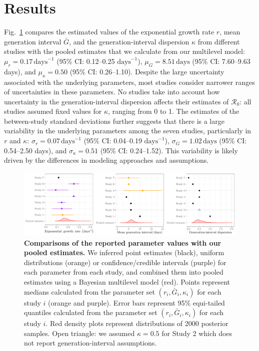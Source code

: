 \documentclass[12pt]{article}
\newcommand{\fref}[1]{Fig.~\ref{fig:#1}}
\newcommand{\Ro}{\ensuremath{{\mathcal R}_{0}}\xspace}
\begin{document}
\section{Results}

\fref{assumption} compares the estimated values of the exponential growth rate $r$, mean generation interval $\bar G$, and the generation-interval dispersion $\kappa$ from different studies with the pooled estimates that we calculate from our multilevel model:
$\mu_r = 0.17\,\textrm{days}^{-1}$ (95\% CI: 0.12--0.25 $\textrm{days}^{-1}$),
$\mu_G = 8.51\,\textrm{days}$ (95\% CI: 7.60--9.63 days),
and
$\mu_\kappa = 0.50$ (95\% CI: 0.26--1.10).
Despite the large uncertainty associated with the underlying parameters,
most studies consider narrower ranges of uncertainties in these parameters.
No studies take into account how uncertainty in the generation-interval dispersion affects their estimates of \Ro:
all studies assumed fixed values for $\kappa$, ranging from 0 to 1.
The estimates of the between-study standard deviations further suggests that there is a large variability in the underlying parameters among the seven studies, particularly in $r$ and $\kappa$:
$\sigma_r = 0.07\,\textrm{days}^{-1}$ (95\% CI: 0.04--0.19 $\textrm{days}^{-1}$),
$\sigma_G = 1.02\,\textrm{days}$ (95\% CI: 0.54--2.50 days),
and
$\sigma_\kappa = 0.51$ (95\% CI: 0.24--1.52).
This variability is likely driven by the differences in modeling approaches and assumptions.

\begin{figure}[t]
\includegraphics[width=\textwidth]{compare_assumption.pdf}
\caption{
\textbf{Comparisons of the reported parameter values with our pooled estimates.}
We inferred point estimates (black), uniform distributions (orange) or confidence/credible intervals (purple) for each parameter from each study, and combined them into pooled estimates using a Bayesian multilevel model (red).
Points represent medians calculated from the parameter set $(r_{i}, \bar{G}_{i}, \kappa_{i})$ for each study $i$ (orange and purple).
Error bars represent 95\% equi-tailed quantiles calculated from the parameter set $(r_{i}, \bar{G}_{i}, \kappa_{i})$ for each study $i$.
Red density plots represent distributions of 2000 posterior samples.
Open triangle: we assumed $\kappa=0.5$ for Study 2 which does not report generation-interval assumptions.
}
\label{fig:assumption}
\end{figure}
\end{document}

